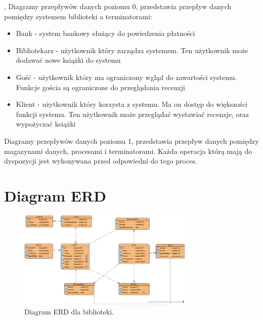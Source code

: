 \documentclass[12pt]{article}
\begin{document}
\newpage, \clearpage
\newpage
Diagramy przepływów danych poziomu 0, przedstawia przepływ danych pomiędzy systemem biblioteki a terminatorami:
\begin{itemize}
    \item Bank - system bankowy służący do powiedzenia płatności
    \item Bibliotekarz - użytkownik który zarządza systemem. Ten użytkownik może dodawać nowe książki do systemu
    \item Gość - użytkownik który ma ograniczony wgląd do zawartości systemu. Funkcje gościa są ograniczone do przeglądania recenzji
    \item Klient - użytkownik który korzysta z systemu. Ma on dostęp do większości funkcji systemu. Ten użytkownik może przeglądać wystawiać recenzje, oraz wypożyczać książki
\end{itemize}

Diagramy przepływów danych poziomu 1, przedstawia przepływ danych pomiędzy magazynami danych, procesami i terminatorami. Każda operacja którą mają do dyspozycji jest wykonywana przed odpowiedni do tego proces.

\newpage
\section{Diagram ERD}
\begin{figure}[!h]
    \centering
    \includegraphics[width=0.75\textwidth]{Schemat_ERD}
    \caption{Diagram ERD dla biblioteki.}
\end{figure}
\end{document}
